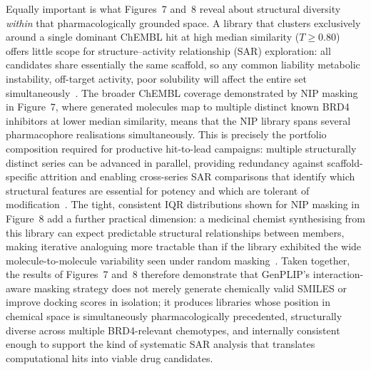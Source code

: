 \documentclass[a4paper,12pt]{article}
\begin{document}
Equally important is what Figures~7 and~8 reveal about structural
diversity \emph{within} that pharmacologically grounded space.
A library that clusters exclusively around a single dominant ChEMBL hit
at high median similarity ($T \geq 0.80$) offers little scope for
structure--activity relationship (SAR) exploration: all candidates share
essentially the same scaffold, so any common liability metabolic
instability, off-target activity, poor solubility will affect the
entire set simultaneously~\cite{Paul2010}.
The broader ChEMBL coverage demonstrated by NIP masking in Figure~7,
where generated molecules map to multiple distinct known BRD4 inhibitors
at lower median similarity, means that the NIP library spans several
pharmacophore realisations simultaneously.
This is precisely the portfolio composition required for productive
hit-to-lead campaigns: multiple structurally distinct series can be
advanced in parallel, providing redundancy against scaffold-specific
attrition and enabling cross-series SAR comparisons that identify which
structural features are essential for potency and which are tolerant of
modification~\cite{bemis1996scaffolds}.
The tight, consistent IQR distributions shown for NIP masking in
Figure~8 add a further practical dimension: a medicinal chemist
synthesising from this library can expect predictable structural
relationships between members, making iterative analoguing more
tractable than if the library exhibited the wide molecule-to-molecule
variability seen under random masking~\cite{maggiora2014}.
Taken together, the results of Figures~7 and~8 therefore demonstrate
that GenPLIP's interaction-aware masking strategy does not merely
generate chemically valid SMILES or improve docking scores in isolation;
it produces libraries whose position in chemical space is simultaneously
pharmacologically precedented, structurally diverse across multiple
BRD4-relevant chemotypes, and internally consistent enough to support
the kind of systematic SAR analysis that translates computational hits
into viable drug candidates.
\end{document}
